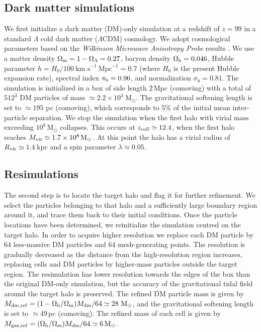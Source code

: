 \documentclass[useAMS,usenatbib]{mnras}
\newcommand{\kms}{\text{km~s}^{-1}}
\newcommand{\ob}{\Omega_{\rm b}}
\newcommand{\ol}{\Omega_\Lambda}
\newcommand{\om}{\Omega_{\rm m}}
\newcommand{\msun}{\text{M}_\odot}
\newcommand{\mdm}{M_{\rm dm}}
\newcommand{\rvir}{R_{\rm vir}}
\newcommand{\mvir}{M_{\rm vir}}
\begin{document}
\subsection{Dark matter simulations}
\label{subsec:DMsimulations}

We first initialize a dark matter (DM)-only simulation at a redshift of $z = 99$ in a standard $\Lambda$ cold dark matter ($\Lambda$CDM) cosmology. We adopt cosmological parameters based on the \emph{Wilkinson Microwave Anisotropy Probe} results \citep{Komatsu_2009}. We use a matter density $\om = 1- \ol = 0.27$, baryon density $\ob = 0.046$, Hubble parameter $h = H_0/100~\kms~\text{Mpc}^{-1} = 0.7$ (where $H_0$ is the present Hubble expansion rate), spectral index $n_{\rm s} = 0.96$, and normalization $\sigma_8 = 0.81$. The simulation is initialized in a box of side length $2\,$Mpc (comoving) with a total of $512^3$ DM particles of mass $\simeq 2.2\times 10^3~\msun$. The gravitational softening length is set to $\simeq 195$ pc (comoving), which corresponds to 5\% of the initial mean inter-particle separation. We stop the simulation when the first halo with virial mass exceeding $10^8\,\msun$ collapses. This occurs at $z_{\rm coll} \simeq 12.4$, when the first halo reaches $\mvir \simeq 1.7 \times 10^8\,\msun$. At this point the halo has a virial radius of $\rvir \simeq 1.4\,$kpc and a spin parameter $\lambda \simeq 0.05$.

\subsection{Resimulations}
\label{subsec:resimulations}

The second step is to locate the target halo and flag it for further refinement. We select the particles belonging to that halo and a sufficiently large boundary region around it, and trace them back to their initial conditions. Once the particle locations have been determined, we reinitialize the simulation centred on the target halo. In order to acquire higher resolution we replace each DM particle by 64 less-massive DM particles and 64 mesh-generating points. The resolution is gradually decreased as the distance from the high-resolution region increases, replacing cells and DM particles by higher-mass particles outside the target region. The resimulation has lower resolution towards the edges of the box than the original DM-only simulation, but the accuracy of the gravitational tidal field around the target halo is preserved. The refined DM particle mass is given by $M_{\rm dm,ref} = (1 - \ob/\om)\mdm/64 \simeq 28~\msun$, and the gravitational softening length is set to $\simeq 49\,$pc (comoving). The refined mass of each cell is given by $M_{\rm gas,ref} = (\ob/\om)\mdm/64 \simeq 6\,\msun$.
\end{document}
